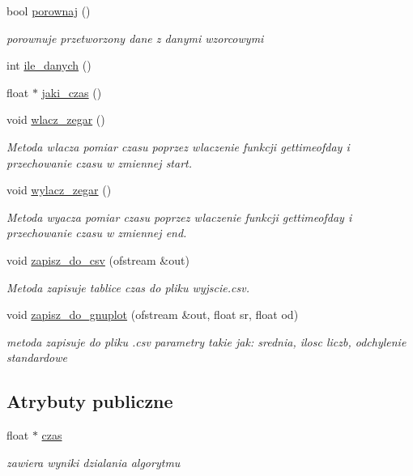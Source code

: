 \begin{DoxyCompactItemize}
bool \hyperlink{classalgorytm_a167adca6239e12cb5d362fd7c905dde0}{porownaj} ()
\begin{DoxyCompactList}\small\item\em porownuje przetworzony dane z danymi wzorcowymi \end{DoxyCompactList}\item 
int \hyperlink{classalgorytm_acbd9260a0b2055acee485f737b960992}{ile\-\_\-danych} ()
\item 
float $\ast$ \hyperlink{classalgorytm_adcd99d6f8b10e222f47fd61328b84c67}{jaki\-\_\-czas} ()
\item 
void \hyperlink{classalgorytm_a5ace80a05bfc1305938d173753102ea2}{wlacz\-\_\-zegar} ()
\begin{DoxyCompactList}\small\item\em Metoda wlacza pomiar czasu poprzez wlaczenie funkcji {\ttfamily gettimeofday} i przechowanie czasu w zmiennej {\ttfamily start}. \end{DoxyCompactList}\item 
void \hyperlink{classalgorytm_a12c132e1a407f5dd38796f4d24308a6c}{wylacz\-\_\-zegar} ()
\begin{DoxyCompactList}\small\item\em Metoda wyacza pomiar czasu poprzez wlaczenie funkcji {\ttfamily gettimeofday} i przechowanie czasu w zmiennej {\ttfamily end}. \end{DoxyCompactList}\item 
void \hyperlink{classalgorytm_a8354af1fb9c7452012a6defcf98d39d8}{zapisz\-\_\-do\-\_\-csv} (ofstream \&out)
\begin{DoxyCompactList}\small\item\em Metoda zapisuje tablice {\ttfamily czas} do pliku {\ttfamily wyjscie.\-csv}. \end{DoxyCompactList}\item 
void \hyperlink{classalgorytm_ad2051f4366b78a7c73adc8b3418a495c}{zapisz\-\_\-do\-\_\-gnuplot} (ofstream \&out, float sr, float od)
\begin{DoxyCompactList}\small\item\em metoda zapisuje do pliku .csv parametry takie jak\-: srednia, ilosc liczb, odchylenie standardowe \end{DoxyCompactList}\end{DoxyCompactItemize}
\subsection*{Atrybuty publiczne}
\begin{DoxyCompactItemize}
\item 
float $\ast$ \hyperlink{classalgorytm_a8005d5f3266848b756400e3bb189de58}{czas}
\begin{DoxyCompactList}\small\item\em zawiera wyniki dzialania algorytmu \end{DoxyCompactList}\end{DoxyCompactItemize}
